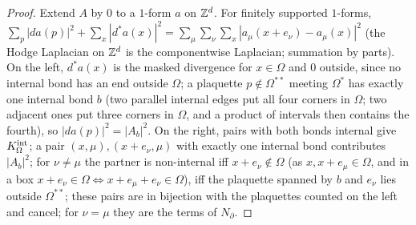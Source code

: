 \begin{proof}
Extend $A$ by $0$ to a $1$-form $a$ on $\mathbb Z^d$. For finitely supported $1$-forms, $\sum_p|da(p)|^2+\sum_x|d^*a(x)|^2=\sum_\mu\sum_\nu\sum_x|a_\mu(x+e_\nu)-a_\mu(x)|^2$ (the Hodge Laplacian on $\mathbb Z^d$ is the componentwise Laplacian; summation by parts). On the left, $d^*a(x)$ is the masked divergence for $x\in\Omega$ and $0$ outside, since no internal bond has an end outside $\Omega$; a plaquette $p\notin\Omega^{**}$ meeting $\Omega^*$ has exactly one internal bond $b$ (two parallel internal edges put all four corners in $\Omega$; two adjacent ones put three corners in $\Omega$, and a product of intervals then contains the fourth), so $|da(p)|^2=|A_b|^2$. On the right, pairs with both bonds internal give $K^{\rm int}_\Omega$; a pair $(x,\mu),(x+e_\nu,\mu)$ with exactly one internal bond contributes $|A_b|^2$; for $\nu\ne\mu$ the partner is non-internal iff $x+e_\nu\notin\Omega$ (as $x,x+e_\mu\in\Omega$, and in a box $x+e_\nu\in\Omega\iff x+e_\mu+e_\nu\in\Omega$), \ie iff the plaquette spanned by $b$ and $e_\nu$ lies outside $\Omega^{**}$; these pairs are in bijection with the plaquettes counted on the left and cancel; for $\nu=\mu$ they are the terms of $N_\partial$.
\end{proof}

